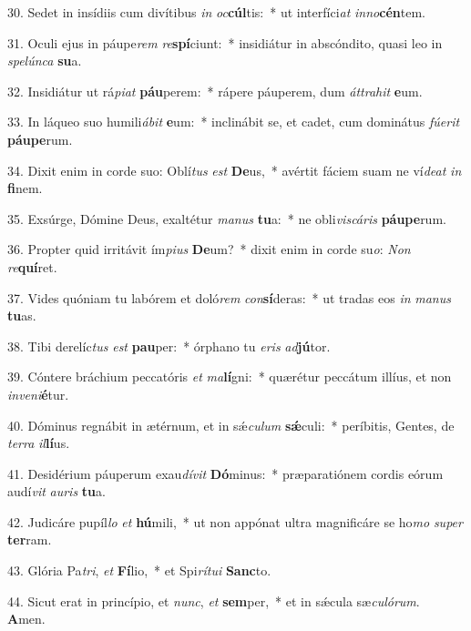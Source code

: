 30. Sedet in insídiis cum divítibus \textit{in} \textit{oc}\textbf{cúl}tis:~*  ut interfíci\textit{at} \textit{in}\textit{no}\textbf{cén}tem.\

31. Oculi ejus in páupe\textit{rem} \textit{re}\textbf{spí}ciunt:~*  insidiátur in abscóndito, quasi leo in \textit{spe}\textit{lún}\textit{ca} \textbf{su}a.\

32. Insidiátur ut rá\textit{pi}\textit{at} \textbf{páu}perem:~*  rápere páuperem, dum \textit{át}\textit{tra}\textit{hit} \textbf{e}um.\

33. In láqueo suo humili\textit{á}\textit{bit} \textbf{e}um:~*  inclinábit se, et cadet, cum dominátus \textit{fú}\textit{e}\textit{rit} \textbf{páu}\textbf{pe}rum.\

34. Dixit enim in corde suo: Oblí\textit{tus} \textit{est} \textbf{De}us,~*  avértit fáciem suam ne ví\textit{de}\textit{at} \textit{in} \textbf{fi}nem.\

35. Exsúrge, Dómine Deus, exaltétur \textit{ma}\textit{nus} \textbf{tu}a:~*  ne obli\textit{vis}\textit{cá}\textit{ris} \textbf{páu}\textbf{pe}rum.\

36. Propter quid irritávit ím\textit{pi}\textit{us} \textbf{De}um?~*  dixit enim in corde su\textit{o}: \textit{Non} \textit{re}\textbf{quí}ret.\

37. Vides quóniam tu labórem et doló\textit{rem} \textit{con}\textbf{sí}deras:~*  ut tradas eos \textit{in} \textit{ma}\textit{nus} \textbf{tu}as.\

38. Tibi derelíc\textit{tus} \textit{est} \textbf{pau}per:~*  órphano tu \textit{e}\textit{ris} \textit{ad}\textbf{jú}tor.\

39. Cóntere bráchium peccatóris \textit{et} \textit{ma}\textbf{lí}gni:~*  quærétur peccátum illíus, et non \textit{in}\textit{ve}\textit{ni}\textbf{é}tur.\

40. Dóminus regnábit in ætérnum, et in sǽ\textit{cu}\textit{lum} \textbf{sǽ}culi:~*  períbitis, Gentes, de \textit{ter}\textit{ra} \textit{il}\textbf{lí}us.\

41. Desidérium páuperum exau\textit{dí}\textit{vit} \textbf{Dó}minus:~*  præparatiónem cordis eórum audí\textit{vit} \textit{au}\textit{ris} \textbf{tu}a.\

42. Judicáre pupíl\textit{lo} \textit{et} \textbf{hú}mili,~*  ut non appónat ultra magnificáre se ho\textit{mo} \textit{su}\textit{per} \textbf{ter}ram.\

43. Glória Pa\textit{tri}, \textit{et} \textbf{Fí}lio,~*  et Spi\textit{rí}\textit{tu}\textit{i} \textbf{Sanc}to.\

44. Sicut erat in princípio, et \textit{nunc}, \textit{et} \textbf{sem}per,~*  et in sǽcula sæ\textit{cu}\textit{ló}\textit{rum}. \textbf{A}men.\

